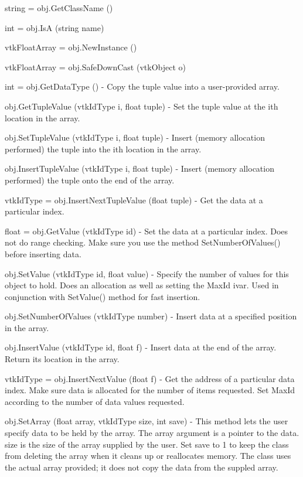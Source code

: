 \begin{DoxyItemize}
\item {\ttfamily string = obj.\-Get\-Class\-Name ()}  
\item {\ttfamily int = obj.\-Is\-A (string name)}  
\item {\ttfamily vtk\-Float\-Array = obj.\-New\-Instance ()}  
\item {\ttfamily vtk\-Float\-Array = obj.\-Safe\-Down\-Cast (vtk\-Object o)}  
\item {\ttfamily int = obj.\-Get\-Data\-Type ()} -\/ Copy the tuple value into a user-\/provided array.  
\item {\ttfamily obj.\-Get\-Tuple\-Value (vtk\-Id\-Type i, float tuple)} -\/ Set the tuple value at the ith location in the array.  
\item {\ttfamily obj.\-Set\-Tuple\-Value (vtk\-Id\-Type i, float tuple)} -\/ Insert (memory allocation performed) the tuple into the ith location in the array.  
\item {\ttfamily obj.\-Insert\-Tuple\-Value (vtk\-Id\-Type i, float tuple)} -\/ Insert (memory allocation performed) the tuple onto the end of the array.  
\item {\ttfamily vtk\-Id\-Type = obj.\-Insert\-Next\-Tuple\-Value (float tuple)} -\/ Get the data at a particular index.  
\item {\ttfamily float = obj.\-Get\-Value (vtk\-Id\-Type id)} -\/ Set the data at a particular index. Does not do range checking. Make sure you use the method Set\-Number\-Of\-Values() before inserting data.  
\item {\ttfamily obj.\-Set\-Value (vtk\-Id\-Type id, float value)} -\/ Specify the number of values for this object to hold. Does an allocation as well as setting the Max\-Id ivar. Used in conjunction with Set\-Value() method for fast insertion.  
\item {\ttfamily obj.\-Set\-Number\-Of\-Values (vtk\-Id\-Type number)} -\/ Insert data at a specified position in the array.  
\item {\ttfamily obj.\-Insert\-Value (vtk\-Id\-Type id, float f)} -\/ Insert data at the end of the array. Return its location in the array.  
\item {\ttfamily vtk\-Id\-Type = obj.\-Insert\-Next\-Value (float f)} -\/ Get the address of a particular data index. Make sure data is allocated for the number of items requested. Set Max\-Id according to the number of data values requested.  
\item {\ttfamily obj.\-Set\-Array (float array, vtk\-Id\-Type size, int save)} -\/ This method lets the user specify data to be held by the array. The array argument is a pointer to the data. size is the size of the array supplied by the user. Set save to 1 to keep the class from deleting the array when it cleans up or reallocates memory. The class uses the actual array provided; it does not copy the data from the suppled array.  

\end{DoxyItemize}
